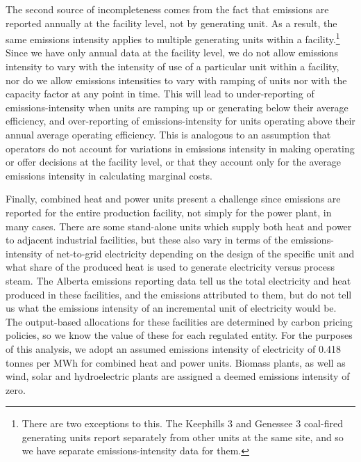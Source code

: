 \documentclass[12pt]{article}
\begin{document}
The second source of incompleteness comes from the fact that emissions are reported annually at the facility level, not by generating unit. As a result, the same emissions intensity applies to multiple generating units within a facility.\footnote{There are two exceptions to this. The Keephills 3 and Genessee 3 coal-fired generating units report separately from other units at the same site, and so we have separate emissions-intensity data for them.} Since we have only annual data at the facility level, we do not allow emissions intensity to vary with the intensity of use of a particular unit within a facility, nor do we allow emissions intensities to vary with ramping of units nor with the capacity factor at any point in time. This will lead to under-reporting of emissions-intensity when units are ramping up or generating below their average efficiency, and over-reporting of emissions-intensity for units operating above their annual average operating efficiency. This is analogous to an assumption that operators do not account for variations in emissions intensity in making operating or offer decisions at the facility level, or that they account only for the average emissions intensity in calculating marginal costs.

Finally, combined heat and power units present a challenge since emissions are reported for the entire production facility, not simply for the power plant, in many cases. There are some stand-alone units which supply both heat and power to adjacent industrial facilities, but these also vary in terms of the emissions-intensity of net-to-grid electricity depending on the design of the specific unit and what share of the produced heat is used to generate electricity versus process steam. The Alberta emissions reporting data tell us the total electricity and heat produced in these facilities, and the emissions attributed to them, but do not tell us what the emissions intensity of an incremental unit of electricity would be. The output-based allocations for these facilities are determined by carbon pricing policies, so we know the value of these for each regulated entity. For the purposes of this analysis, we adopt an assumed emissions intensity of electricity of 0.418 tonnes per MWh for combined heat and power units. Biomass plants, as well as wind, solar and hydroelectric plants are assigned a deemed emissions intensity of zero.
\end{document}
